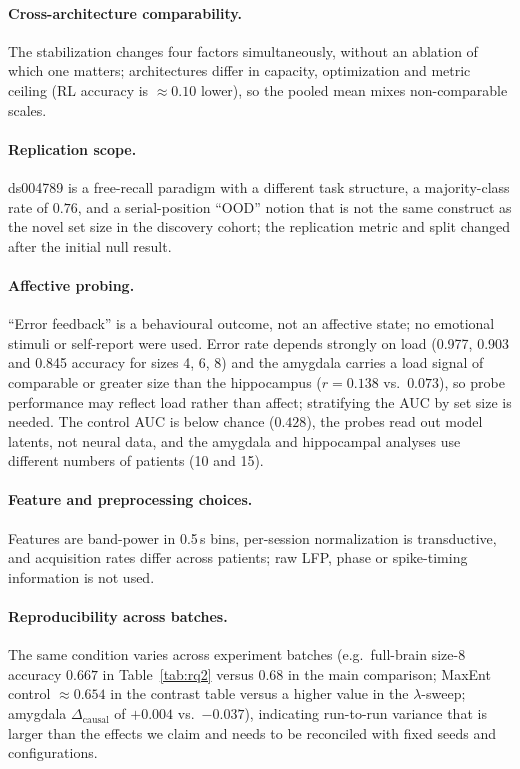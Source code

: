 \documentclass[conference]{IEEEtran}
\newcommand{\dcausal}{\Delta_{\mathrm{causal}}}
\begin{document}
\paragraph{Cross-architecture comparability.}
The stabilization changes four factors simultaneously, without an ablation of which one matters; architectures differ in capacity, optimization and metric ceiling (RL accuracy is $\approx0.10$ lower), so the pooled mean mixes non-comparable scales.

\paragraph{Replication scope.}
ds004789 is a free-recall paradigm with a different task structure, a majority-class rate of $0.76$, and a serial-position ``OOD'' notion that is not the same construct as the novel set size in the discovery cohort; the replication metric and split changed after the initial null result.

\paragraph{Affective probing.}
``Error feedback'' is a behavioural outcome, not an affective state; no emotional stimuli or self-report were used. Error rate depends strongly on load (0.977, 0.903 and 0.845 accuracy for sizes 4, 6, 8) and the amygdala carries a load signal of comparable or greater size than the hippocampus ($r=0.138$ vs.\ $0.073$), so probe performance may reflect load rather than affect; stratifying the AUC by set size is needed. The control AUC is below chance ($0.428$), the probes read out model latents, not neural data, and the amygdala and hippocampal analyses use different numbers of patients (10 and 15).

\paragraph{Feature and preprocessing choices.}
Features are band-power in 0.5\,s bins, per-session normalization is transductive, and acquisition rates differ across patients; raw LFP, phase or spike-timing information is not used.

\paragraph{Reproducibility across batches.}
The same condition varies across experiment batches (e.g.\ full-brain size-8 accuracy $0.667$ in Table~\ref{tab:rq2} versus $0.68$ in the main comparison; MaxEnt control $\approx0.654$ in the contrast table versus a higher value in the $\lambda$-sweep; amygdala $\dcausal$ of $+0.004$ vs.\ $-0.037$), indicating run-to-run variance that is larger than the effects we claim and needs to be reconciled with fixed seeds and configurations.
\end{document}
